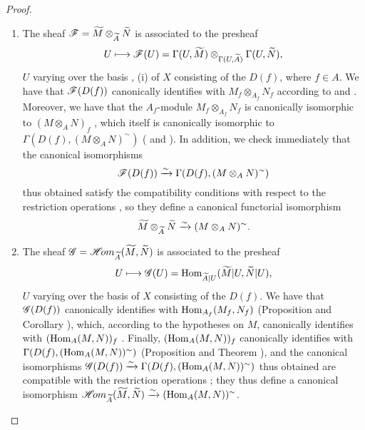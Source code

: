 \begin{proof}
\label{proof-1.1.3.12}
\medskip\noindent
\begin{enumerate}[label=(\roman*)]
  \item The sheaf $\mathscr{F}=\widetilde{M}\otimes_{\widetilde{A}}\widetilde{N}$ is associated to the presheaf
    \[
      U\longmapsto\mathscr{F}(U)=\Gamma(U,\widetilde{M})\otimes_{\Gamma(U,\widetilde{A})}\Gamma(U,\widetilde{N}),
    \]
    $U$ varying over the basis , (i) of $X$ consisting of the
    $D(f)$, where $f\in A$. We have that $\mathscr{F}(D(f))$ canonically identifies with
    $M_f\otimes_{A_f}N_f$ according to  and .
    Moreover, we have that the $A_f$-module $M_f\otimes_{A_f}N_f$ is canonically
    isomorphic to $(M\otimes_A N)_f$ , which itself is canonically
    isomorphic to $\Gamma(D(f),(M\otimes_A N)^\sim)$ ( and
    ). In addition, we check immediately that the canonical
    isomorphisms
    \[
      \mathscr{F}(D(f))\xrightarrow{\sim}\Gamma(D(f),(M\otimes_A N)^\sim)
    \]
    thus obtained satisfy the compatibility conditions with respect to the restriction
    operations , so they define a canonical functorial isomorphism
    \[
      \widetilde{M}\otimes_{\widetilde{A}}\widetilde{N}\xrightarrow{\sim}(M\otimes_A N)^\sim.
    \]
  \item The sheaf $\mathscr{G}=\mathscr{H}\!{om}_{\widetilde{A}}(\widetilde{M},\widetilde{N})$ is associated to the presheaf
    \[
      U\longmapsto\mathscr{G}(U)={\mathop{\mathrm{Hom}}\nolimits}_{\widetilde{A}|U}(\widetilde{M}|U,\widetilde{N}|U),
    \]
    $U$ varying over the basis of $X$ consisting of the $D(f)$. We have that $\mathscr{G}(D(f))$ canonically
    identifies with ${\mathop{\mathrm{Hom}}\nolimits}_{A_f}(M_f,N_f)$ (Proposition  and
    Corollary ), which, according to the hypotheses on $M$, canonically
    identifies with $({\mathop{\mathrm{Hom}}\nolimits}_A(M,N))_f$ . Finally, $({\mathop{\mathrm{Hom}}\nolimits}_A(M,N))_f$
    canonically identifies with $\Gamma(D(f),({\mathop{\mathrm{Hom}}\nolimits}_A(M,N))^\sim)$ (Proposition 
    and Theorem ), and the canonical isomorphisms
    $\mathscr{G}(D(f))\xrightarrow{\sim}\Gamma(D(f),({\mathop{\mathrm{Hom}}\nolimits}_A(M,N))^\sim)$ thus obtained are compatible with the restriction
    operations ; they thus define a canonical isomorphism
    $\mathscr{H}\!{om}_{\widetilde{A}}(\widetilde{M},\widetilde{N})\xrightarrow{\sim}({\mathop{\mathrm{Hom}}\nolimits}_A(M,N))^\sim$.
\end{enumerate}
\end{proof}

